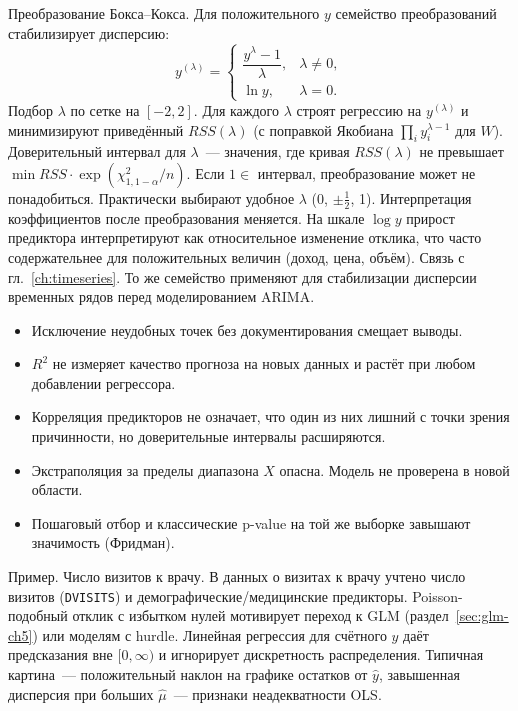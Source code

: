 Преобразование Бокса--Кокса. Для положительного $y$ семейство преобразований стабилизирует дисперсию:
\[ y^{(\lambda)}=
\begin{cases}
\dfrac{y^\lambda-1}{\lambda}, & \lambda\neq 0,\\[6pt] \ln y, & \lambda=0.
\end{cases}
\]
Подбор $\lambda$ по сетке на $[-2,2]$. Для каждого $\lambda$ строят регрессию на $y^{(\lambda)}$ и минимизируют приведённый $RSS(\lambda)$ (с поправкой Якобиана $\prod_i y_i^{\lambda-1}$ для $W$).
Доверительный интервал для $\lambda$~--- значения, где кривая $RSS(\lambda)$ не превышает $\min RSS\cdot \exp(\chi^2_{1,1-\alpha}/n)$. Если $1\in$ интервал, преобразование может не понадобиться.
Практически выбирают удобное $\lambda$ (0, $\pm\frac12$, 1).
Интерпретация коэффициентов после преобразования меняется. На шкале $\log y$ прирост предиктора интерпретируют как относительное изменение отклика, что часто содержательнее для положительных величин (доход, цена, объём).
Связь с гл.~\ref{ch:timeseries}. То же семейство применяют для стабилизации дисперсии временных рядов перед моделированием ARIMA.

\begin{itemize}
    \item Исключение неудобных точек без документирования смещает выводы.
    \item $R^2$ не измеряет качество прогноза на новых данных и растёт
          при любом добавлении регрессора.
    \item Корреляция предикторов не означает, что один из них лишний с точки
          зрения причинности, но доверительные интервалы расширяются.
    \item Экстраполяция за пределы диапазона $X$ опасна. Модель не проверена
          в новой области.
    \item Пошаговый отбор и классические p-value на той же выборке
          завышают значимость (Фридман).
\end{itemize}

Пример. Число визитов к врачу. В данных о визитах к врачу учтено число визитов (\texttt{DVISITS}) и демографические/медицинские предикторы.
Poisson-подобный отклик с избытком нулей мотивирует переход к GLM (раздел~\ref{sec:glm-ch5}) или моделям с hurdle. Линейная регрессия для счётного $y$ даёт предсказания вне $[0,\infty)$ и игнорирует дискретность распределения.
Типичная картина~--- положительный наклон на графике остатков от $\hat y$, завышенная дисперсия при больших $\hat\mu$~--- признаки неадекватности OLS.

